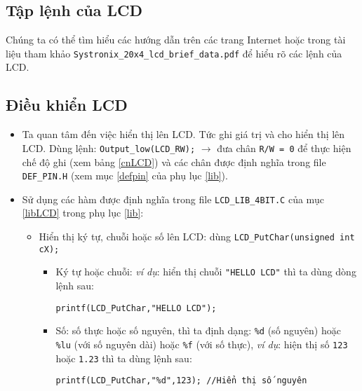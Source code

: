 \subsection{Tập lệnh của LCD}
\hspace{.6cm}Chúng ta có thể tìm hiểu các hướng dẫn trên các trang Internet hoặc trong tài liệu tham khảo \verb|Systronix_20x4_lcd_brief_data.pdf| để hiểu rõ các lệnh của LCD.
\subsection{Điều khiển LCD}
\begin{itemize}
\item Ta quan tâm đến việc hiển thị lên LCD. Tức ghi giá trị và cho hiển thị lên LCD. Dùng lệnh: \verb|Output_low(LCD_RW);| $\longrightarrow$ đưa chân \verb|R/W = 0| để thực hiện chế độ ghi (xem bảng \ref{cnLCD}) và các chân được định nghĩa trong file \verb|DEF_PIN.H| (xem mục \ref{defpin} của phụ lục \ref{lib}).
\item Sử dụng các hàm được định nghĩa trong file \verb|LCD_LIB_4BIT.C| của mục \ref{libLCD} trong phụ lục \ref{lib}:
\begin{itemize}
\item Hiển thị ký tự, chuỗi hoặc số lên LCD: dùng \verb|LCD_PutChar(unsigned int cX);|
\begin{itemize}
\item Ký tự hoặc chuỗi: \textit{ví dụ}: hiển thị chuỗi \verb|"HELLO LCD"| thì ta dùng dòng lệnh sau:
\begin{verbatim}
printf(LCD_PutChar,"HELLO LCD");
\end{verbatim}
\item Số: số thực hoặc số nguyên, thì ta định dạng: \verb|%d| (số nguyên) hoặc \verb|%lu| (với số nguyên dài) hoặc \verb|%f| (với số thực), \textit{ví dụ}: hiện thị số \verb|123| hoặc \verb|1.23| thì ta dùng lệnh sau:
\begin{verbatim}
printf(LCD_PutChar,"%d",123); //Hiển thị số nguyên


\end{verbatim}
\end{itemize}
\end{itemize}
\end{itemize}
